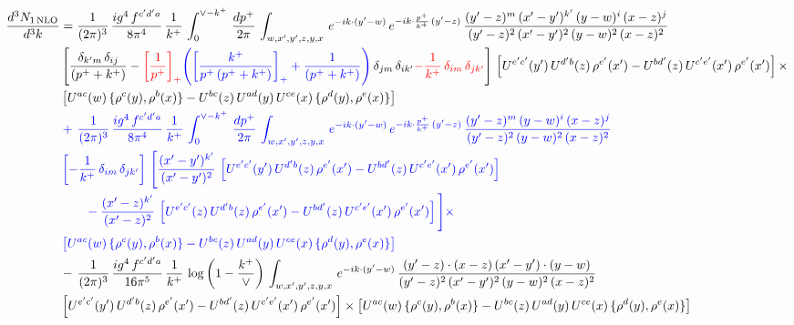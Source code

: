 \documentclass[10pt]{article}
\numberwithin{equation}{section}
\newcommand{\new}[1]{{\color{blue}#1}}
\newcommand{\old}[1]{{\color{red}#1}}
\newcommand{\nc}{\color{blue}}
\begin{document}
\begin{align}
     \frac{d^{3}N_{1\,\rm NLO}}{d^{3}k} & =  \frac{1}{(2\pi)^{3}}\, \frac{ig^{4}\,f^{c'd'a}}{8\pi^{4}}\, \frac{1}{k^{+}}\,\int_{0}^{\vee-k^{+}}\,  \frac{dp^{+}}{2\pi}\, \int_{w,x',y',z,y,x}\, e^{-ik\cdot (y'-w)}\, e^{-ik\cdot \frac{p^{+}}{k^{+}}\,(y'-z)}\,\frac{(y'-z)^{m}\,(x'-y')^{k'}\,(y-w)^{i}\,(x-z)^{j}}{(y'-z)^{2}\,(x'-y')^{2}\,(y-w)^{2}\,(x-z)^{2}}\notag \\ & \left[\frac{\delta_{k'm}\,\delta_{ij}}{(p^{+}+k^{+})}-\old{\left[\frac{1}{p^{+}}\right]_{+}}\new{\left(\left[\frac{k^{+}}{p^{+}\,(p^{+}+k^{+})}\right]_{+}+\frac{1}{(p^{+}+k^{+})}\right)}\,\delta_{jm}\,\delta_{ik'}\old{-\frac{1}{k^{+}}\, \delta_{im}\, \delta_{jk'}}\right]\, \left[U^{e'c'}(y')\,U^{d'b}(z)\,\rho^{e'}(x')-U^{bd'}(z)\,U^{c'e'}(x')\,\rho^{e'}(x')\right]\times\notag \\ &  \left[U^{ac}(w)\, \{\rho^{c}(y),\rho^{b}(x)\}-U^{bc}(z)\,U^{ad}(y)\,U^{ce}(x)\,\{\rho^{d}(y),\rho^{e}(x)\}\right] \notag \\
& \nc  +\,\frac{1}{(2\pi)^{3}}\, \frac{ig^{4}\,f^{c'd'a}}{8\pi^{4}}\, \frac{1}{k^{+}}\,\int_{0}^{\vee-k^{+}}\,  \frac{dp^{+}}{2\pi}\, \int_{w,x',y',z,y,x}\, e^{-ik\cdot (y'-w)}\, e^{-ik\cdot \frac{p^{+}}{k^{+}}\,(y'-z)}\,\frac{(y'-z)^{m}\,(y-w)^{i}\,(x-z)^{j}}{(y'-z)^{2}\,(y-w)^{2}\,(x-z)^{2}}\notag \\ & \nc  \left[-\frac{1}{k^{+}}\, \delta_{im}\, \delta_{jk'}\right]\, \Bigg[\frac{(x'-y')^{k'}}{(x'-y')^{2}}\,\left[U^{e'c'}(y')\,U^{d'b}(z)\,\rho^{e'}(x')-U^{bd'}(z)\,U^{c'e'}(x')\,\rho^{e'}(x')\right]\notag \\ & \nc  \qquad-\frac{(x'-z)^{k'}}{(x'-z)^{2}}\,\left[U^{e'c'}(z)\,U^{d'b}(z)\,\rho^{e'}(x')-U^{bd'}(z)\,U^{c'e'}(x')\,\rho^{e'}(x')\right]\Bigg]\times\notag \\ & \nc   \left[U^{ac}(w)\, \{\rho^{c}(y),\rho^{b}(x)\}-U^{bc}(z)\,U^{ad}(y)\,U^{ce}(x)\,\{\rho^{d}(y),\rho^{e}(x)\}\right] \notag \\
& -\,\frac{1}{(2\pi)^{3}}\, \frac{ig^{4}\,f^{c'd'a}}{16\pi^{5}}\, \frac{1}{k^{+}}\,\log{\left(1-\frac{k^{+}}{\vee}\right)}\, \int_{w,x',y',z,y,x}\, e^{-ik\cdot (y'-w)}\,\frac{(y'-z)\cdot (x-z)\,(x'-y')\cdot (y-w)}{(y'-z)^{2}\,(x'-y')^{2}\,(y-w)^{2}\,(x-z)^{2}}\notag \\ &  \left[U^{e'c'}(y')\,U^{d'b}(z)\,\rho^{e'}(x')-U^{bd'}(z)\,U^{c'e'}(x')\,\rho^{e'}(x')\right]\times  \left[U^{ac}(w)\, \{\rho^{c}(y),\rho^{b}(x)\}-U^{bc}(z)\,U^{ad}(y)\,U^{ce}(x)\,\{\rho^{d}(y),\rho^{e}(x)\}\right] \label{eq:F:G3III1}
\end{align}
\end{document}
